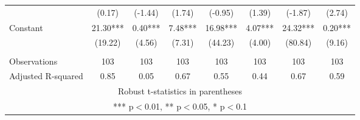 \documentclass[]{article}
\begin{document}
\begin{tabular}{lccccccc}
 & (0.17) & (-1.44) & (1.74) & (-0.95) & (1.39) & (-1.87) & (2.74) \\
Constant & 21.30*** & 0.40*** & 7.48*** & 16.98*** & 4.07*** & 24.32*** & 0.20*** \\
 & (19.22) & (4.56) & (7.31) & (44.23) & (4.00) & (80.84) & (9.16) \\
 &  &  &  &  &  &  &  \\
Observations & 103 & 103 & 103 & 103 & 103 & 103 & 103 \\
 Adjusted R-squared & 0.85 & 0.05 & 0.67 & 0.55 & 0.44 & 0.67 & 0.59 \\ \hline
\multicolumn{8}{c}{ Robust t-statistics in parentheses} \\
\multicolumn{8}{c}{ *** p$<$0.01, ** p$<$0.05, * p$<$0.1} \\
\end{tabular}
\end{document}
